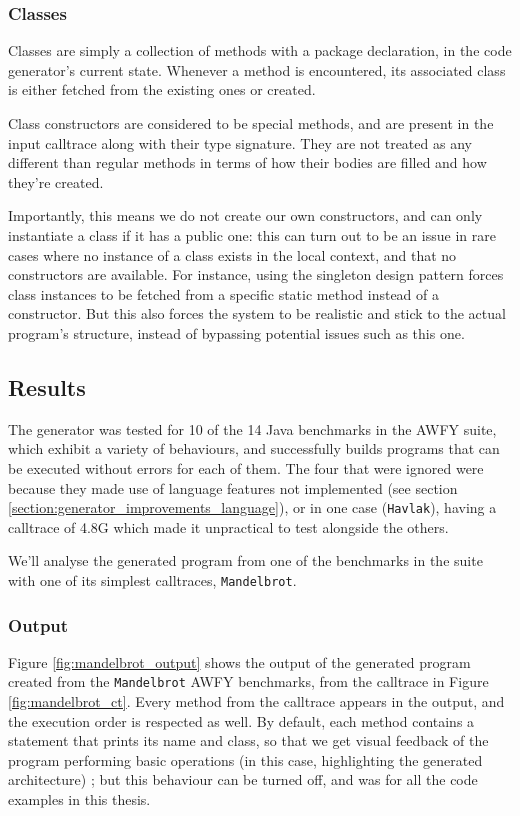 \documentclass[12pt]{article}
\begin{document}
\subsubsection{Classes}
Classes are simply a collection of methods with a package declaration, in the code generator's current state. Whenever a method is encountered, its associated class is either fetched from the existing ones or created.

Class constructors are considered to be special methods, and are present in the input calltrace along with their type signature. They are not treated as any different than regular methods in terms of how their bodies are filled and how they're created. 

Importantly, this means we do not create our own constructors, and can only instantiate a class if it has a public one: this can turn out to be an issue in rare cases where no instance of a class exists in the local context, and that no constructors are available. For instance, using the singleton design pattern forces class instances to be fetched from a specific static method instead of a constructor. But this also forces the system to be realistic and stick to the actual program's structure, instead of bypassing potential issues such as this one.

\clearpage
\subsection{Results}
The generator was tested for 10 of the 14 Java benchmarks in the AWFY suite, which exhibit a variety of behaviours, and successfully builds programs that can be executed without errors for each of them. The four that were ignored were because they made use of language features not implemented (see section \ref{section:generator_improvements_language}), or in one case (\texttt{Havlak}), having a calltrace of 4.8G which made it unpractical to test alongside the others.

We'll analyse the generated program from one of the benchmarks in the suite with one of its simplest calltraces, \texttt{Mandelbrot}.

\subsubsection{Output}
Figure \ref{fig:mandelbrot_output} shows the output of the generated program created from the \texttt{Mandelbrot} AWFY benchmarks, from the calltrace in Figure \ref{fig:mandelbrot_ct}. Every method from the calltrace appears in the output, and the execution order is respected as well. By default, each method contains a statement that prints its name and class, so that we get visual feedback of the program performing basic operations (in this case, highlighting the generated architecture) ; but this behaviour can be turned off, and was for all the code examples in this thesis. 
\end{document}
